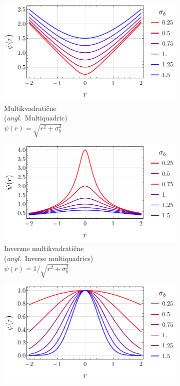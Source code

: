 \documentclass[12pt,a4paper,twoside]{article}
\theoremstyle{definition} %
\theoremstyle{plain} %
\numberwithin{equation}{section}
\newcommand{\ang}[1]{(\hspace{-1.5px}\textit{angl.}\ #1)}
\begin{document}
\begin{figure}[h]
  \centering
  \begin{subfigure}[t]{0.33\textwidth}
    \includegraphics[width=\textwidth]{images/rbf_mq.pdf}
    \caption[Multikvadratične.]{Multikvadratične \\ \ang{Multiquadric}  \\ $\psi(r) = \sqrt{r^2+\sigma_b^2}$}
  \end{subfigure}
  \begin{subfigure}[t]{0.33\textwidth}
    \includegraphics[width=\textwidth]{images/rbf_imq.pdf}
    \caption[Inverzne multikvadratične.]{Inverzne multikvadratične \\ \ang{Inverse multiquadrics}  \\ $\psi(r) = 1 / \sqrt{r^2+\sigma_b^2}$}
  \end{subfigure}
  \begin{subfigure}[t]{0.32\textwidth}
    \includegraphics[width=\textwidth]{images/rbf_gau.pdf}

\end{subfigure}
\end{figure}
\end{document}
